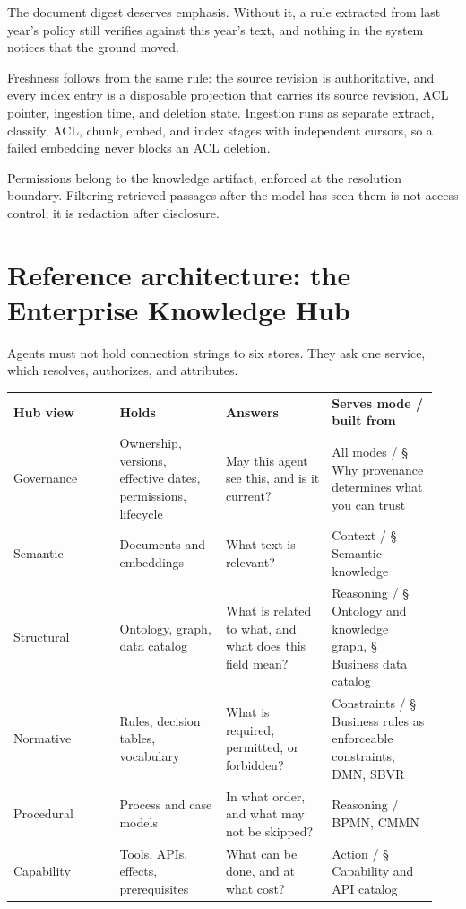 The document digest deserves emphasis. Without it, a rule extracted from last year's policy still verifies against this year's text, and nothing in the system notices that the ground moved.\par

Freshness follows from the same rule: the source revision is authoritative, and every index entry is a disposable projection that carries its source revision, ACL pointer, ingestion time, and deletion state. Ingestion runs as separate extract, classify, ACL, chunk, embed, and index stages with independent cursors, so a failed embedding never blocks an ACL deletion.\par

\begin{booksecurity}
Permissions belong to the knowledge artifact, enforced at the resolution boundary. Filtering retrieved passages after the model has seen them is not access control; it is redaction after disclosure.
\end{booksecurity}

\section{Reference architecture: the Enterprise Knowledge Hub}

Agents must not hold connection strings to six stores. They ask one service, which resolves, authorizes, and attributes.\par

\BookTableStart
\fontsize{7.2}{9}\selectfont
\begin{tabular}{@{}Y{0.2350\linewidth}Y{0.2350\linewidth}Y{0.2350\linewidth}Y{0.2350\linewidth}@{}}
\color{white}\bfseries Hub view & \color{white}\bfseries Holds & \color{white}\bfseries Answers & \color{white}\bfseries Serves mode / built from \\
Governance & Ownership, versions, effective dates, permissions, lifecycle & May this agent see this, and is it current? & All modes / § Why provenance determines what you can trust \\
Semantic & Documents and embeddings & What text is relevant? & Context / § Semantic knowledge \\
Structural & Ontology, graph, data catalog & What is related to what, and what does this field mean? & Reasoning / § Ontology and knowledge graph, § Business data catalog \\
Normative & Rules, decision tables, vocabulary & What is required, permitted, or forbidden? & Constraints / § Business rules as enforceable constraints, DMN, SBVR \\
Procedural & Process and case models & In what order, and what may not be skipped? & Reasoning / BPMN, CMMN \\
Capability & Tools, APIs, effects, prerequisites & What can be done, and at what cost? & Action / § Capability and API catalog \\
\end{tabular}
\BookTableEnd


